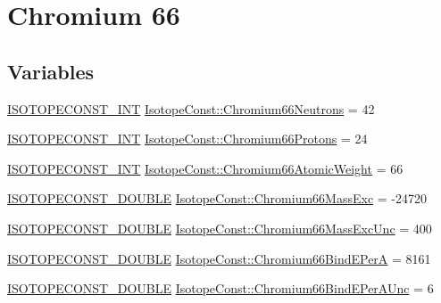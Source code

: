 \hypertarget{group___isotope_const-_chromium-_cr66}{}\section{Chromium 66}
\label{group___isotope_const-_chromium-_cr66}
\subsection*{Variables}
\begin{DoxyCompactItemize}
\item 
\mbox{\hyperlink{group___isotope_const-_macros_ga5f18360b3e99483a35c32d789e62621c}{I\+S\+O\+T\+O\+P\+E\+C\+O\+N\+S\+T\+\_\+\+I\+NT}} \mbox{\hyperlink{group___isotope_const-_chromium-_cr66_ga59b4d7ef51a7fb9dbfbbc164350785cc}{Isotope\+Const\+::\+Chromium66\+Neutrons}} = 42
\item 
\mbox{\hyperlink{group___isotope_const-_macros_ga5f18360b3e99483a35c32d789e62621c}{I\+S\+O\+T\+O\+P\+E\+C\+O\+N\+S\+T\+\_\+\+I\+NT}} \mbox{\hyperlink{group___isotope_const-_chromium-_cr66_gafa2654f8d55a5d2c47c0ce8aa5d39896}{Isotope\+Const\+::\+Chromium66\+Protons}} = 24
\item 
\mbox{\hyperlink{group___isotope_const-_macros_ga5f18360b3e99483a35c32d789e62621c}{I\+S\+O\+T\+O\+P\+E\+C\+O\+N\+S\+T\+\_\+\+I\+NT}} \mbox{\hyperlink{group___isotope_const-_chromium-_cr66_ga3d172637c0b2832baf92038cb015a515}{Isotope\+Const\+::\+Chromium66\+Atomic\+Weight}} = 66
\item 
\mbox{\hyperlink{group___isotope_const-_macros_ga8f45a7272ce02c0b4c65c44636ed719a}{I\+S\+O\+T\+O\+P\+E\+C\+O\+N\+S\+T\+\_\+\+D\+O\+U\+B\+LE}} \mbox{\hyperlink{group___isotope_const-_chromium-_cr66_gaf7d7f9e00f97118051a957cf28a56472}{Isotope\+Const\+::\+Chromium66\+Mass\+Exc}} = -\/24720
\item 
\mbox{\hyperlink{group___isotope_const-_macros_ga8f45a7272ce02c0b4c65c44636ed719a}{I\+S\+O\+T\+O\+P\+E\+C\+O\+N\+S\+T\+\_\+\+D\+O\+U\+B\+LE}} \mbox{\hyperlink{group___isotope_const-_chromium-_cr66_ga78ee816d67adf4a1e8e260c99c8456bb}{Isotope\+Const\+::\+Chromium66\+Mass\+Exc\+Unc}} = 400
\item 
\mbox{\hyperlink{group___isotope_const-_macros_ga8f45a7272ce02c0b4c65c44636ed719a}{I\+S\+O\+T\+O\+P\+E\+C\+O\+N\+S\+T\+\_\+\+D\+O\+U\+B\+LE}} \mbox{\hyperlink{group___isotope_const-_chromium-_cr66_ga4bac3de51861a4856bf63601aa023955}{Isotope\+Const\+::\+Chromium66\+Bind\+E\+PerA}} = 8161
\item 
\mbox{\hyperlink{group___isotope_const-_macros_ga8f45a7272ce02c0b4c65c44636ed719a}{I\+S\+O\+T\+O\+P\+E\+C\+O\+N\+S\+T\+\_\+\+D\+O\+U\+B\+LE}} \mbox{\hyperlink{group___isotope_const-_chromium-_cr66_ga4778721aaf22c66b6e4eb22fdd516321}{Isotope\+Const\+::\+Chromium66\+Bind\+E\+Per\+A\+Unc}} = 6

\end{DoxyCompactItemize}

